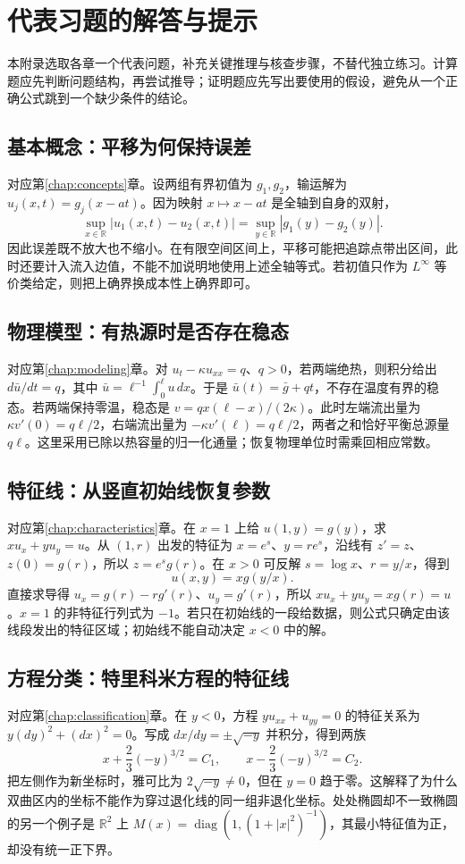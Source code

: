 \setcounter{chapter}{3} %
\chapter{代表习题的解答与提示}
\label{app:worked-exercises}

本附录选取各章一个代表问题，补充关键推理与核查步骤，不替代独立练习。计算题应先判断问题结构，再尝试推导；证明题应先写出要使用的假设，避免从一个正确公式跳到一个缺少条件的结论。

\section{基本概念：平移为何保持误差}
对应第\ref{chap:concepts}章。设两组有界初值为 $g_1,g_2$，输运解为 $u_j(x,t)=g_j(x-at)$。因为映射 $x\mapsto x-at$ 是全轴到自身的双射，
\[
 \sup_{x\in\mathbb R}|u_1(x,t)-u_2(x,t)|
 =\sup_{y\in\mathbb R}|g_1(y)-g_2(y)|.
\]
因此误差既不放大也不缩小。在有限空间区间上，平移可能把追踪点带出区间，此时还要计入流入边值，不能不加说明地使用上述全轴等式。若初值只作为 $L^\infty$ 等价类给定，则把上确界换成本性上确界即可。

\section{物理模型：有热源时是否存在稳态}
对应第\ref{chap:modeling}章。对 $u_t-\kappa u_{xx}=q$、$q>0$，若两端绝热，则积分给出 $d\bar u/dt=q$，其中 $\bar u=\ell^{-1}\int_0^\ell u\,dx$。于是 $\bar u(t)=\bar g+qt$，不存在温度有界的稳态。若两端保持零温，稳态是 $v=q x(\ell-x)/(2\kappa)$。此时左端流出量为 $\kappa v'(0)=q\ell/2$，右端流出量为 $-\kappa v'(\ell)=q\ell/2$，两者之和恰好平衡总源量 $q\ell$。这里采用已除以热容量的归一化通量；恢复物理单位时需乘回相应常数。

\section{特征线：从竖直初始线恢复参数}
对应第\ref{chap:characteristics}章。在 $x=1$ 上给 $u(1,y)=g(y)$，求 $xu_x+yu_y=u$。从 $(1,r)$ 出发的特征为 $x=e^s$、$y=re^s$，沿线有 $z'=z$、$z(0)=g(r)$，所以 $z=e^sg(r)$。在 $x>0$ 可反解 $s=\log x$、$r=y/x$，得到
\[
 u(x,y)=xg(y/x).
\]
直接求导得 $u_x=g(r)-rg'(r)$、$u_y=g'(r)$，所以 $xu_x+yu_y=xg(r)=u$。$x=1$ 的非特征行列式为 $-1$。若只在初始线的一段给数据，则公式只确定由该线段发出的特征区域；初始线不能自动决定 $x<0$ 中的解。

\section{方程分类：特里科米方程的特征线}
对应第\ref{chap:classification}章。在 $y<0$，方程 $yu_{xx}+u_{yy}=0$ 的特征关系为 $y(dy)^2+(dx)^2=0$。写成 $dx/dy=\pm\sqrt{-y}$ 并积分，得到两族
\[
 x+\frac23(-y)^{3/2}=C_1,\qquad
 x-\frac23(-y)^{3/2}=C_2.
\]
把左侧作为新坐标时，雅可比为 $2\sqrt{-y}\ne0$，但在 $y=0$ 趋于零。这解释了为什么双曲区内的坐标不能作为穿过退化线的同一组非退化坐标。处处椭圆却不一致椭圆的另一个例子是 $\mathbb R^2$ 上 $M(x)=\operatorname{diag}(1,(1+|x|^2)^{-1})$，其最小特征值为正，却没有统一正下界。

